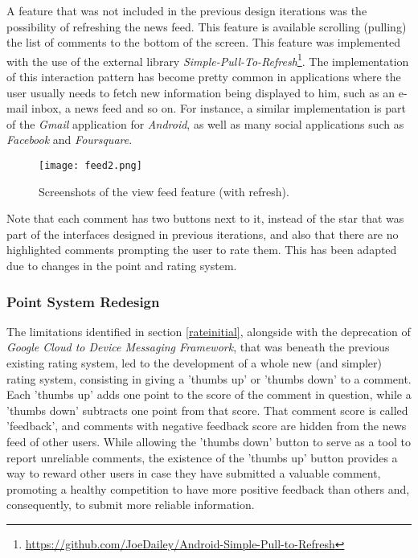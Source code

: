 A feature that was not included in the previous design iterations was the possibility of refreshing the news feed. This feature is available scrolling (pulling) the list of comments to the bottom of the screen. This feature was implemented with the use of the external library \emph{Simple-Pull-To-Refresh}\footnote{\url{https://github.com/JoeDailey/Android-Simple-Pull-to-Refresh}}. The implementation of this interaction pattern has become pretty common in applications where the user usually needs to fetch new information being displayed to him, such as an e-mail inbox, a news feed and so on. For instance, a similar implementation is part of the \emph{Gmail} application for \emph{Android}, as well as many social applications such as \emph{Facebook} and \emph{Foursquare}. 

\begin{figure}[!h]
  \begin{center}
    \leavevmode
    \texttt{[image: feed2.png]}
    \caption{Screenshots of the view feed feature (with refresh).}
    \label{fig:feed2}
  \end{center}
\end{figure}


Note that each comment has two buttons next to it, instead of the star that was part of the interfaces designed in previous iterations, and also that there are no highlighted comments prompting the user to rate them. This has been adapted due to changes in the point and rating system.

\subsubsection{Point System Redesign}\label{points}

The limitations identified in section \ref{rateinitial}, alongside with the deprecation of \emph{Google Cloud to Device Messaging Framework}, that was beneath the previous existing rating system, led to the development of a whole new (and simpler) rating system, consisting in giving a 'thumbs up' or 'thumbs down' to a comment. Each 'thumbs up' adds one point to the score of the comment in question, while a 'thumbs down' subtracts one point from that score. That comment score is called 'feedback', and comments with negative feedback score are hidden from the news feed of other users. While allowing the 'thumbs down' button to serve as a tool to report unreliable comments, the existence of the 'thumbs up' button provides a way to reward other users in case they have submitted a valuable comment, promoting a healthy competition to have more positive feedback than others and, consequently, to submit more reliable information. 

